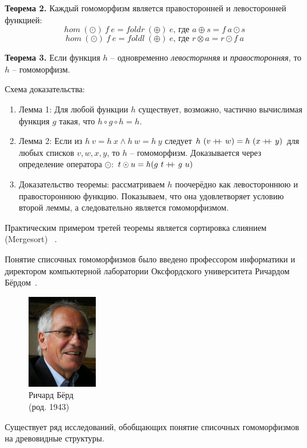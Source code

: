 \documentclass[a4paper,11pt]{article}
\newcommand\doubleplus{+\kern-1.3ex+\kern0.8ex}
\begin{document}
\textbf{Теорема 2.} Каждый гомоморфизм является правосторонней и левосторонней
функцией:
\begin{equation*}
  hom~(\odot)~f~e = foldr~(\oplus)~e \text{, где } a \oplus s = f~a \odot s
\end{equation*}
\begin{equation*}
  hom~(\odot)~f~e = foldl~(\oplus)~e \text{, где } r \otimes a = r \odot f~a
\end{equation*}

\textbf{Теорема 3.} Если функция $h$ -- одновременно \emph{левосторнняя} и
\emph{правосторонняя}, то $h$ -- гомоморфизм.

Схема доказательства:
\begin{enumerate}
\item Лемма 1: Для любой функции $h$ существует, возможно, частично вычислимая 
  функция $g$ такая, что $h \circ g \circ h = h$.
\item Лемма 2: Если из $h~v = h~x \wedge h~w = h~y$ следует 
  $h~(v \doubleplus w) = h~(x \doubleplus y)$ для любых списков $v, w, x, y$,
  то $h$ -- гомоморфизм. Доказывается через определение оператора $\odot$:
  $t \odot u = h(g~t \doubleplus g~u)$
\item Доказательство теоремы: рассматриваем $h$ поочерёдно как левостороннюю
  и правостороннюю функцию. Показываем, что она удовлетворяет условию второй
  леммы, а следовательно является гомоморфизмом.
\end{enumerate}

Практическим примером третей теоремы является сортировка слиянием (Mergesort)
~\cite{Gibbons95thethird}. 

Понятие списочных гомоморфизмов было введено профессором информатики
и директором компьютерной лаборатории Оксфордского университета
Ричардом Бёрдом~\cite{Bird:1987:ITL:42675.42676}.
\begin{figure}[ht!]
  \begin{center}
    \includegraphics[height=40mm]{lecture9/bird.eps}
    \caption{Ричард Бёрд\\(род. 1943)}
  \end{center}
\end{figure}

Существует ряд исследований, обобщающих понятие списочных гомоморфизмов на
древовидные структуры.
\nocite{*}


\end{document}
